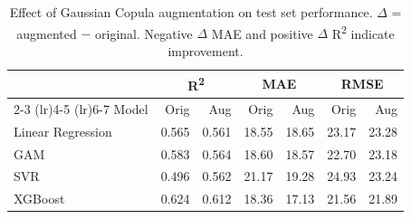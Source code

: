 \begin{table}
    \caption{Effect of Gaussian Copula augmentation on test set performance.
             $\Delta$ = augmented $-$ original. Negative $\Delta$ MAE and 
             positive $\Delta$ R\textsuperscript{2} indicate improvement.}
    \label{tab:augmentation_results}
    \centering
    \small
    \begin{tabular}{lrrrrrr}
        \toprule
        & \multicolumn{2}{c}{R\textsuperscript{2}} 
        & \multicolumn{2}{c}{MAE} 
        & \multicolumn{2}{c}{RMSE} \\
        \cmidrule(lr){2-3} \cmidrule(lr){4-5} \cmidrule(lr){6-7}
        Model & Orig & Aug & Orig & Aug & Orig & Aug \\
        \midrule
        Linear Regression & 0.565 & 0.561 & 18.55 & 18.65 & 23.17 & 23.28 \\
        GAM & 0.583 & 0.564 & 18.60 & 18.57 & 22.70 & 23.18 \\
        SVR & 0.496 & 0.562 & 21.17 & 19.28 & 24.93 & 23.24 \\
        XGBoost & 0.624 & 0.612 & 18.36 & 17.13 & 21.56 & 21.89 \\
        \bottomrule
    \end{tabular}
\end{table}
